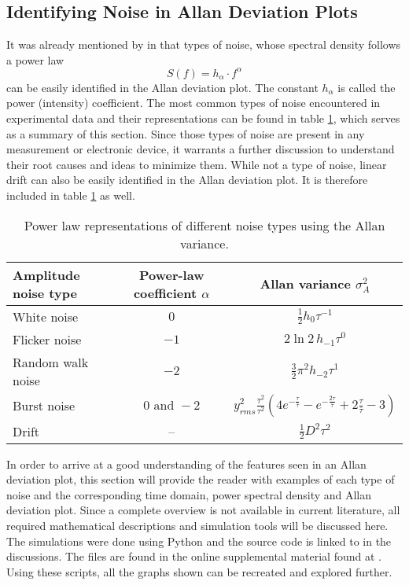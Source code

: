 \subsection{Identifying Noise in Allan Deviation Plots}
It was already mentioned by \citeauthor{adev} in \cite{adev} that types of noise, whose spectral density follows a power law
\begin{equation}
    S(f) = h_{\alpha} \cdot f^\alpha \label{eqn:power_law}
\end{equation}
can be easily identified in the Allan deviation plot. The constant $h_\alpha$ is called the power (intensity) coefficient. The most common types of noise encountered in experimental data and their representations can be found in table \ref{tab:adev_alpha}, which serves as a summary of this section. Since those types of noise are present in any measurement or electronic device, it warrants a further discussion to understand their root causes and ideas to minimize them. While not a type of noise, linear drift can also be easily identified in the Allan deviation plot. It is therefore included in table \ref{tab:adev_alpha} as well.
\begin{table}[ht]
    \centering
    \begin{tabular}{lcc}
        \toprule
        Amplitude noise type& Power-law coefficient $\alpha$& Allan variance $\sigma_A^2$\\
        \midrule
            White noise & $0$& $\frac 1 2 h_0 \tau^{-1}$ \cite{adev_noise_types}\\
            Flicker noise& $-1$& $2 \ln 2 \, h_{-1} \tau^0$ \cite{adev_noise_types}\\
            Random walk noise& $-2$& $\frac 3 2 \pi^2 h_{-2} \tau^{1}$ \cite{adev_noise_types}\\
            Burst noise& $0 \textrm{ and } -\!2$& $y_{rms}^2\frac{\bar \tau^2}{\tau^2} \left(4 e^{-\frac{\tau}{\bar \tau}} - e^{-\frac{2 \tau}{\bar \tau}} + 2 \frac{\tau}{\bar \tau} - 3 \right)$\\
            Drift & --& $\frac 1 2 D^2 \tau^2$ \cite{adev_drift}\\
        \bottomrule
    \end{tabular}
    \caption{Power law representations of different noise types using the Allan variance.}
    \label{tab:adev_alpha}
\end{table}

In order to arrive at a good understanding of the features seen in an Allan deviation plot, this section will provide the reader with examples of each type of noise and the corresponding time domain, power spectral density and Allan deviation plot. Since a complete overview is not available in current literature, all required mathematical descriptions and simulation tools will be discussed here. The simulations were done using Python and the source code is linked to in the discussions. The files are found in the online supplemental material found at \cite{supplemental_material}. Using these scripts, all the graphs shown can be recreated and explored further.

